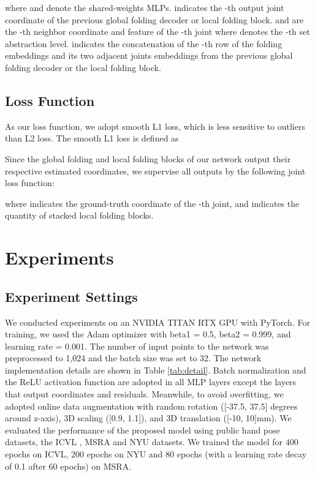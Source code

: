 \documentclass[10pt,twocolumn,letterpaper]{article}
\begin{document}
where  and  denote the shared-weights MLPs.  indicates the -th output joint coordinate of the previous global folding decoder or local folding block.  and  are the -th neighbor coordinate and feature of the -th joint where  denotes the -th set abstraction level. 
 indicates the concatenation of the -th row of the folding embeddings and its two adjacent joints embeddings from the previous global folding decoder or the local folding block.




\subsection{Loss Function}
As our loss function, we adopt smooth L1 loss, which is less sensitive to outliers than L2 loss. The smooth L1 loss is defined as





Since the global folding and local folding blocks of our network output their respective estimated coordinates, we supervise all outputs by the following joint loss function:



where  indicates the ground-truth coordinate of the -th joint, and  indicates the quantity of stacked local folding blocks.

\section{Experiments}

\subsection{Experiment Settings}


We conducted experiments on an NVIDIA TITAN RTX GPU with PyTorch. For training, we used the Adam optimizer \cite{kingma2014adam} with beta1 = 0.5, beta2 = 0.999, and learning rate  = 0.001. The number of input points to the network was preprocessed to 1,024 and the batch size was set to 32. The network implementation details are shown in Table \ref{tab:detail}. Batch normalization \cite{ioffe2015batch} and the ReLU \cite{nair2010rectified} activation function are adopted in all MLP layers except the layers that output coordinates and residuals. Meanwhile, to avoid overfitting, we adopted online data augmentation with random rotation ([-37.5, 37.5] degrees around z-axis), 3D scaling ([0.9, 1.1]), and 3D translation ([-10, 10]mm). We evaluated the performance of the proposed model using public hand pose datasets, the ICVL \cite{tang2014latent}, MSRA \cite{sun2015cascaded} and NYU \cite{tompson2014real} datasets. We trained the model for 400 epochs on ICVL, 200 epochs on NYU and 80 epochs (with a learning rate decay of 0.1 after 60 epochs) on MSRA.
\end{document}
